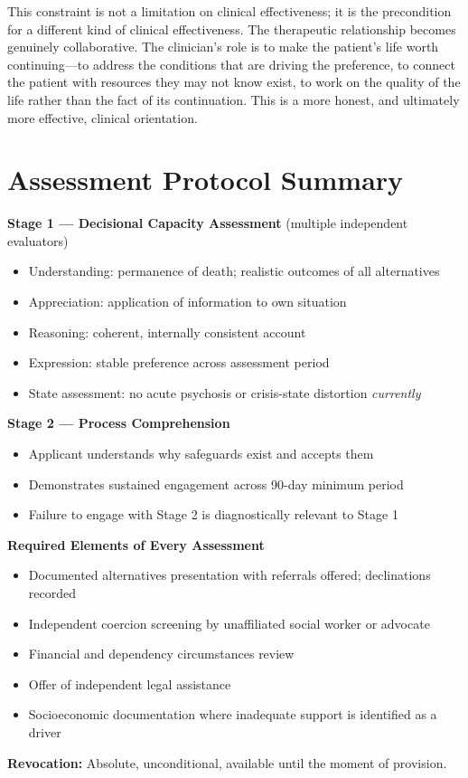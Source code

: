 \documentclass[11pt, letterpaper]{article}
\begin{document}
This constraint is not a limitation on clinical effectiveness; it is the precondition
for a different kind of clinical effectiveness. The therapeutic relationship becomes
genuinely collaborative. The clinician's role is to make the patient's life worth
continuing---to address the conditions that are driving the preference, to connect the
patient with resources they may not know exist, to work on the quality of the life
rather than the fact of its continuation. This is a more honest, and ultimately more
effective, clinical orientation.

\section{Assessment Protocol Summary}

\begin{findingbox}[title={\sffamily\bfseries\small\color{C@accent}
  Clinical Protocol at a Glance}]
\small
\textbf{Stage 1 --- Decisional Capacity Assessment} (multiple independent evaluators)
\begin{itemize}
  \item Understanding: permanence of death; realistic outcomes of all alternatives
  \item Appreciation: application of information to own situation
  \item Reasoning: coherent, internally consistent account
  \item Expression: stable preference across assessment period
  \item State assessment: no acute psychosis or crisis-state distortion \textit{currently}
\end{itemize}

\medskip
\textbf{Stage 2 --- Process Comprehension}
\begin{itemize}
  \item Applicant understands why safeguards exist and accepts them
  \item Demonstrates sustained engagement across 90-day minimum period
  \item Failure to engage with Stage 2 is diagnostically relevant to Stage 1
\end{itemize}

\medskip
\textbf{Required Elements of Every Assessment}
\begin{itemize}
  \item Documented alternatives presentation with referrals offered; declinations recorded
  \item Independent coercion screening by unaffiliated social worker or advocate
  \item Financial and dependency circumstances review
  \item Offer of independent legal assistance
  \item Socioeconomic documentation where inadequate support is identified as a driver
\end{itemize}

\medskip
\textbf{Revocation:} Absolute, unconditional, available until the moment of provision.
\end{findingbox}
\end{document}
